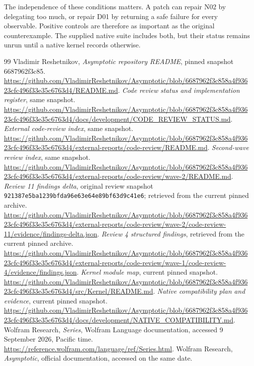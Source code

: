 \documentclass[11pt,letterpaper]{article}
\newcommand{\shortcommit}{6687962f3c85}
\begin{document}
The independence of these conditions matters. A patch can repair N02 by delegating too much, or repair D01 by returning a safe failure for every observable. Positive controls are therefore as important as the original counterexample. The supplied native suite includes both, but their status remains unrun until a native kernel records otherwise.

\begin{thebibliography}{99}
 Vladimir Reshetnikov, \emph{Asymptotic repository README}, pinned snapshot \shortcommit.
\url{https://github.com/VladimirReshetnikov/Asymptotic/blob/6687962f3c858a4f93623cfc496f33e35c6763d4/README.md}.
 \emph{Code review status and implementation register}, same snapshot.
\url{https://github.com/VladimirReshetnikov/Asymptotic/blob/6687962f3c858a4f93623cfc496f33e35c6763d4/docs/development/CODE_REVIEW_STATUS.md}.
 \emph{External code-review index}, same snapshot.
\url{https://github.com/VladimirReshetnikov/Asymptotic/blob/6687962f3c858a4f93623cfc496f33e35c6763d4/external-reports/code-review/README.md}.
 \emph{Second-wave review index}, same snapshot.
\url{https://github.com/VladimirReshetnikov/Asymptotic/blob/6687962f3c858a4f93623cfc496f33e35c6763d4/external-reports/code-review/wave-2/README.md}.
 \emph{Review 11 findings delta}, original review snapshot \nolinkurl{921387e5ba1239bfda96e63e64e89bf63d9c41e6}; retrieved from the current pinned archive.
\url{https://github.com/VladimirReshetnikov/Asymptotic/blob/6687962f3c858a4f93623cfc496f33e35c6763d4/external-reports/code-review/wave-2/code-review-11/evidence/findings-delta.json}.
 \emph{Review 4 structured findings}, retrieved from the current pinned archive.
\url{https://github.com/VladimirReshetnikov/Asymptotic/blob/6687962f3c858a4f93623cfc496f33e35c6763d4/external-reports/code-review/wave-1/code-review-4/evidence/findings.json}.
 \emph{Kernel module map}, current pinned snapshot.
\url{https://github.com/VladimirReshetnikov/Asymptotic/blob/6687962f3c858a4f93623cfc496f33e35c6763d4/src/Kernel/README.md}.
 \emph{Native compatibility plan and evidence}, current pinned snapshot.
\url{https://github.com/VladimirReshetnikov/Asymptotic/blob/6687962f3c858a4f93623cfc496f33e35c6763d4/docs/development/NATIVE_COMPATIBILITY.md}.
 Wolfram Research, \emph{Series}, Wolfram Language documentation, accessed 9 September 2026, Pacific time.
\url{https://reference.wolfram.com/language/ref/Series.html}.
 Wolfram Research, \emph{Asymptotic}, official documentation, accessed on the same date.

\end{thebibliography}
\end{document}
